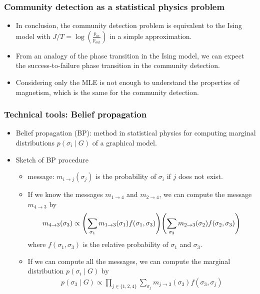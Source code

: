 \documentclass[dvipdfmx,11pt]{beamer}
\begin{document}
\begin{frame}
  \frametitle{Community detection as a statistical physics problem}
  \begin{itemize}
    \item In conclusion, \alert{the community detection problem is equivalent to the Ising model} with $J/T = \log(\frac{p_{in}}{p_{out}})$ in a simple approximation.
    \item From an analogy of the phase transition in the Ising model, we can expect the \alert{success-to-failure phase transition} in the community detection.
    \item Considering only the MLE is not enough to understand the properties of magnetism, which is the same for the community detection.
  \end{itemize}
\end{frame}

\begin{frame}
  \frametitle{Technical tools: Belief propagation}
  \begin{itemize}
    \item \alert{Belief propagation} (BP): method in statistical physics for computing marginal distributions $p(\sigma_i \mid G)$ of a graphical model.
    \item Sketch of BP procedure
    \begin{itemize}
      \item \alert{message}: $m_{i \to j}(\sigma_j)$ is the probability of $\sigma_i$ if $j$ does not exist. 
      \item If we know the messages $m_{1 \to 4}$ and $m_{2 \to 4}$, we can compute the message $m_{4 \to 3}$ by
      \begin{align*}
        m_{4 \to 3}(\sigma_3) \propto \qty(\sum_{\sigma_1} m_{1 \to 3}(\sigma_1)f(\sigma_1, \sigma_3)) \qty(\sum_{\sigma_2} m_{2 \to 3}(\sigma_2)f(\sigma_2, \sigma_3))
      \end{align*}
      where $f(\sigma_1, \sigma_3)$ is the relative probability of $\sigma_1$ and $\sigma_3$.
    \item If we can compute all the messages, we can compute the marginal distribution $p(\sigma_i \mid G)$ by
    \begin{align*}
      p(\sigma_3 \mid G) \propto \prod_{j \in \{1,2,4\} } \sum_{\sigma_j} m_{j \to 3}(\sigma_3) f(\sigma_3, \sigma_j)
    \end{align*}

    \end{itemize}

  \end{itemize}

\end{frame}
\end{document}
